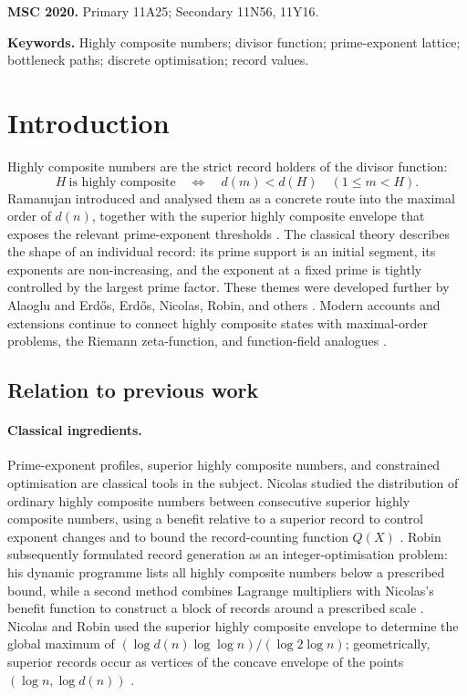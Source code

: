 \documentclass[11pt]{article}
\numberwithin{equation}{section}
\theoremstyle{blueplain}
\theoremstyle{bluedef}
\begin{document}
\medskip
\noindent\textbf{MSC 2020.}
Primary 11A25; Secondary 11N56, 11Y16.

\smallskip
\noindent\textbf{Keywords.}
Highly composite numbers; divisor function; prime-exponent lattice; bottleneck paths; discrete optimisation; record values.

\section{Introduction}
\label{sec:introduction}

Highly composite numbers are the strict record holders of the divisor function:
\begin{equation}
 H\ \text{is highly composite}
 \quad\Longleftrightarrow\quad
 d(m)<d(H)\quad(1\le m<H).
 \label{eq:hcn-definition-intro}
\end{equation}
Ramanujan introduced and analysed them as a concrete route into the maximal order of $d(n)$, together with the superior highly composite envelope that exposes the relevant prime-exponent thresholds \citep{Ramanujan1915,Ramanujan1997}.  The classical theory describes the shape of an individual record: its prime support is an initial segment, its exponents are non-increasing, and the exponent at a fixed prime is tightly controlled by the largest prime factor.  These themes were developed further by Alaoglu and Erd\H{o}s, Erd\H{o}s, Nicolas, Robin, and others \citep{AlaogluErdos1944,Erdos1944,Nicolas1971,Robin1983,NicolasRobin1983}.  Modern accounts and extensions continue to connect highly composite states with maximal-order problems, the Riemann zeta-function, and function-field analogues \citep{AndrewsBerndt2012,Tenenbaum2015,Afshar2021,Nicolas2022,Akatsuka2024,Teo2026}.

\subsection*{Relation to previous work}

\paragraph{Classical ingredients.}
Prime-exponent profiles, superior highly composite numbers, and constrained optimisation are classical tools in the subject.  Nicolas studied the distribution of ordinary highly composite numbers between consecutive superior highly composite numbers, using a benefit relative to a superior record to control exponent changes and to bound the record-counting function $Q(X)$ \citep{Nicolas1971}.  Robin subsequently formulated record generation as an integer-optimisation problem: his dynamic programme lists all highly composite numbers below a prescribed bound, while a second method combines Lagrange multipliers with Nicolas's benefit function to construct a block of records around a prescribed scale \citep{Robin1983}.  Nicolas and Robin used the superior highly composite envelope to determine the global maximum of $(\log d(n)\log\log n)/(\log 2\log n)$; geometrically, superior records occur as vertices of the concave envelope of the points $(\log n,\log d(n))$ \citep{NicolasRobin1983}.
\end{document}
